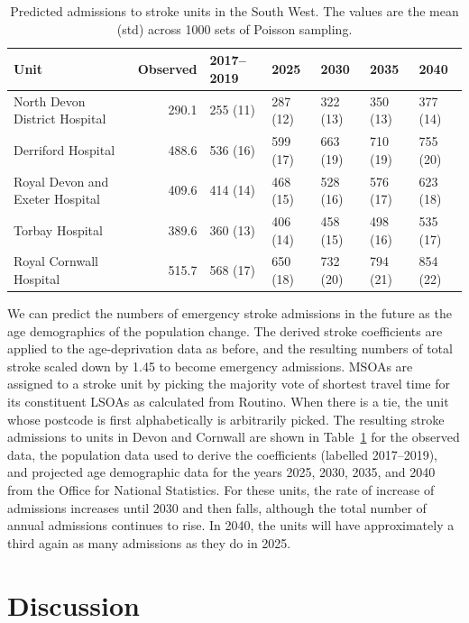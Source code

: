 \documentclass[12pt]{extarticle}
\begin{document}
\begin{table}
\centering
\caption{Predicted admissions to stroke units in the South West. The values are the mean (std) across 1000 sets of Poisson sampling.}
\begin{tabular}{lrlllll}
    Unit & Observed & 2017--2019 & 2025 & 2030 & 2035 & 2040 \\
    \hline
    North Devon District Hospital & 290.1 & 255 (11) & 287 (12) & 322 (13) & 350 (13) & 377 (14) \\
    Derriford Hospital & 488.6 & 536 (16) & 599 (17) & 663 (19) & 710 (19) & 755 (20) \\
    Royal Devon and Exeter Hospital & 409.6 & 414 (14) & 468 (15) & 528 (16) & 576 (17) & 623 (18) \\
    Torbay Hospital & 389.6 & 360 (13) & 406 (14) & 458 (15) & 498 (16) & 535 (17) \\
    Royal Cornwall Hospital & 515.7 & 568 (17) & 650 (18) & 732 (20) & 794 (21) & 854 (22) \\
\end{tabular}
\label{tab:unit_admissions_sw}
\end{table}

We can predict the numbers of emergency stroke admissions in the future as the age demographics of the population change.
The derived stroke coefficients are applied to the age-deprivation data as before, and the resulting numbers of total stroke scaled down by 1.45 to become emergency admissions.
MSOAs are assigned to a stroke unit by picking the majority vote of shortest travel time for its constituent LSOAs as calculated from Routino. When there is a tie, the unit whose postcode is first alphabetically is arbitrarily picked.
The resulting stroke admissions to units in Devon and Cornwall are shown in Table~\ref{tab:unit_admissions_sw} for the observed data, the population data used to derive the coefficients (labelled 2017--2019), and projected age demographic data for the years 2025, 2030, 2035, and 2040 from the Office for National Statistics.
% 
For these units, the rate of increase of admissions increases until 2030 and then falls, although the total number of annual admissions continues to rise. In 2040, the units will have approximately a third again as many admissions as they do in 2025.
% 

\section{Discussion}
\end{document}
